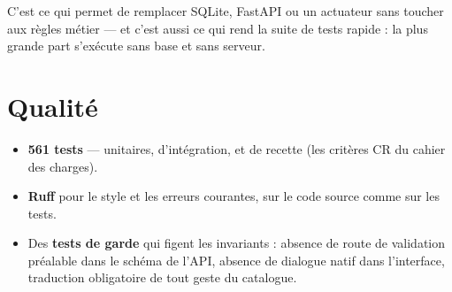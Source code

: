 C'est ce qui permet de remplacer SQLite, FastAPI ou un actuateur sans toucher
aux règles métier — et c'est aussi ce qui rend la suite de tests rapide : la
plus grande part s'exécute sans base et sans serveur.

\section{Qualité}

\begin{itemize}[leftmargin=*]
  \item \textbf{561 tests} — unitaires, d'intégration, et de recette (les
        critères CR du cahier des charges).
  \item \textbf{Ruff} pour le style et les erreurs courantes, sur le code
        source comme sur les tests.
  \item Des \textbf{tests de garde} qui figent les invariants : absence de
        route de validation préalable dans le schéma de l'API, absence de
        dialogue natif dans l'interface, traduction obligatoire de tout geste
        du catalogue.
\end{itemize}
